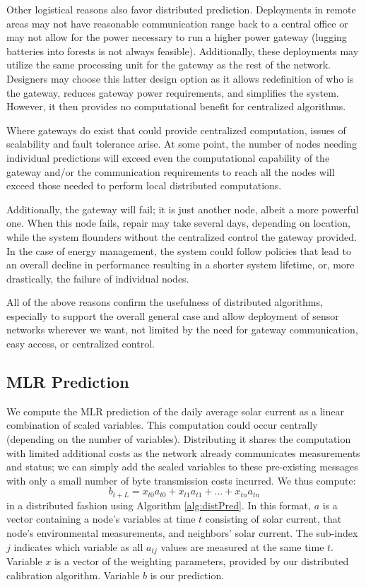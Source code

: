 \documentclass[prodmode,acmtosn]{acmsmall}
\begin{document}
Other logistical reasons also favor distributed prediction. Deployments in remote areas may not have reasonable communication range back to a central office or may not allow for the power necessary to run a higher power gateway (lugging batteries into forests is not always feasible).
Additionally, these deployments may utilize the same processing unit for the gateway as the rest of the network.
Designers may choose this latter design option as it allows redefinition of who is the gateway, reduces gateway power requirements, and simplifies the system.
However, it then provides no computational benefit for centralized algorithms.

Where gateways do exist that could provide centralized computation, issues of scalability and fault tolerance arise.
At some point, the number of nodes needing individual predictions will exceed even the computational capability of the gateway and/or the communication requirements to reach all the nodes will exceed those needed to perform local distributed computations.

Additionally, the gateway will fail; it is just another node, albeit a more powerful one.
When this node fails, repair may take several days, depending on location, while the system flounders without the centralized control the gateway provided.
In the case of energy management, the system could follow policies that lead to an overall decline in performance resulting in a shorter system lifetime, or, more drastically, the failure of individual nodes.

All of the above reasons confirm  the usefulness of distributed algorithms, especially to support the overall general case and allow deployment of sensor networks wherever we want, not limited by the need for gateway communication, easy access, or centralized control.

\subsection{MLR Prediction}
We compute the MLR prediction of the daily average solar current as a linear combination of scaled variables.
This computation could occur centrally (depending on the number of variables).
Distributing it shares the computation with limited additional costs as the network already communicates measurements and status; we can simply add the scaled variables to these pre-existing messages with only a small number of byte transmission costs incurred.
We thus compute:
\begin{equation}
  b_{t+L}=x_{t0}a_{t0}+x_{t1}a_{t1}+...+x_{tn}a_{tn}
\end{equation}
in a distributed fashion using Algorithm \ref{alg:distPred}.
In this format, $a$ is a vector containing a node's variables at time $t$ consisting of solar current, that node's environmental measurements, and neighbors' solar current.
The sub-index $j$ indicates which variable as all $a_{tj}$ values are measured at the same time $t$.
Variable $x$ is a vector of the weighting parameters, provided by our distributed calibration algorithm.
Variable $b$ is our prediction.
\end{document}
